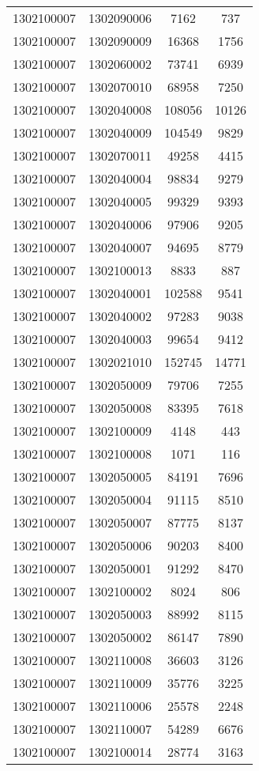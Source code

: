\begin{longtable}{llcc}
1302100007 & 1302090006 & 7162 & 737\\
1302100007 & 1302090009 & 16368 & 1756\\
1302100007 & 1302060002 & 73741 & 6939\\
1302100007 & 1302070010 & 68958 & 7250\\
1302100007 & 1302040008 & 108056 & 10126\\
1302100007 & 1302040009 & 104549 & 9829\\
1302100007 & 1302070011 & 49258 & 4415\\
1302100007 & 1302040004 & 98834 & 9279\\
1302100007 & 1302040005 & 99329 & 9393\\
1302100007 & 1302040006 & 97906 & 9205\\
1302100007 & 1302040007 & 94695 & 8779\\
1302100007 & 1302100013 & 8833 & 887\\
1302100007 & 1302040001 & 102588 & 9541\\
1302100007 & 1302040002 & 97283 & 9038\\
1302100007 & 1302040003 & 99654 & 9412\\
1302100007 & 1302021010 & 152745 & 14771\\
1302100007 & 1302050009 & 79706 & 7255\\
1302100007 & 1302050008 & 83395 & 7618\\
1302100007 & 1302100009 & 4148 & 443\\
1302100007 & 1302100008 & 1071 & 116\\
1302100007 & 1302050005 & 84191 & 7696\\
1302100007 & 1302050004 & 91115 & 8510\\
1302100007 & 1302050007 & 87775 & 8137\\
1302100007 & 1302050006 & 90203 & 8400\\
1302100007 & 1302050001 & 91292 & 8470\\
1302100007 & 1302100002 & 8024 & 806\\
1302100007 & 1302050003 & 88992 & 8115\\
1302100007 & 1302050002 & 86147 & 7890\\
1302100007 & 1302110008 & 36603 & 3126\\
1302100007 & 1302110009 & 35776 & 3225\\
1302100007 & 1302110006 & 25578 & 2248\\
1302100007 & 1302110007 & 54289 & 6676\\
1302100007 & 1302100014 & 28774 & 3163\\

\end{longtable}
